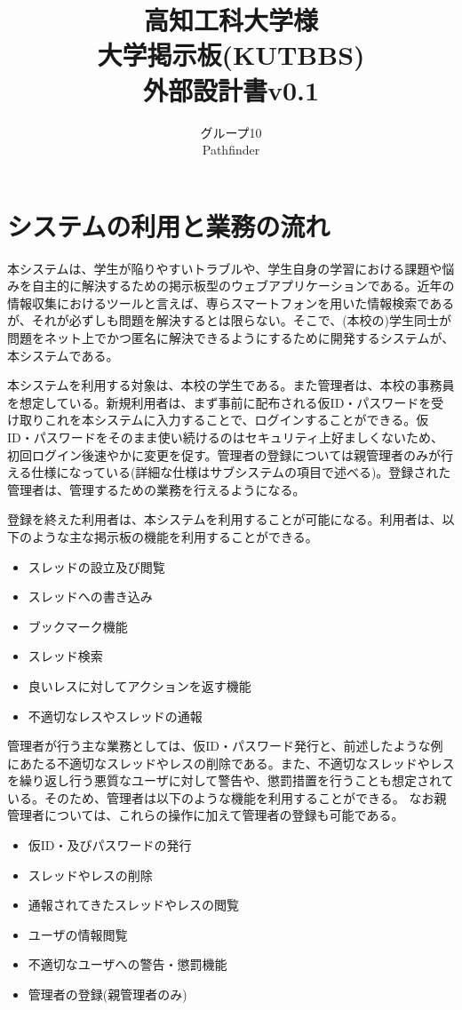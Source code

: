 \documentclass[a4j]{jarticle}
\title{
\vspace{30mm}
{\bf 高知工科大学様}
\\
\vspace{5mm}
大学掲示板(KUTBBS)\\
\vspace{5mm}
{\bf  外部設計書v0.1}
\vspace{90mm}
}
\author{
\vspace{5mm}
グループ10 \\
\vspace{5mm}
Pathfinder \\
\vspace{5mm}
\vspace{10mm}
}
\begin{document}
\maketitle
\tableofcontents
\newpage




\section{システムの利用と業務の流れ}
本システムは、学生が陥りやすいトラブルや、学生自身の学習における課題や悩みを自主的に解決するための掲示板型のウェブアプリケーションである。近年の情報収集におけるツールと言えば、専らスマートフォンを用いた情報検索であるが、それが必ずしも問題を解決するとは限らない。そこで、(本校の)学生同士が問題をネット上でかつ匿名に解決できるようにするために開発するシステムが、本システムである。



本システムを利用する対象は、本校の学生である。また管理者は、本校の事務員を想定している。新規利用者は、まず事前に配布される仮ID・パスワードを受け取りこれを本システムに入力することで、ログインすることができる。仮ID・パスワードをそのまま使い続けるのはセキュリティ上好ましくないため、初回ログイン後速やかに変更を促す。管理者の登録については親管理者のみが行える仕様になっている(詳細な仕様はサブシステムの項目で述べる)。登録された管理者は、管理するための業務を行えるようになる。


登録を終えた利用者は、本システムを利用することが可能になる。利用者は、以下のような主な掲示板の機能を利用することができる。
\begin{itemize}
  \item スレッドの設立及び閲覧
  \item スレッドへの書き込み
  \item ブックマーク機能
  \item スレッド検索
  \item 良いレスに対してアクションを返す機能
  \item 不適切なレスやスレッドの通報
\end{itemize}



管理者が行う主な業務としては、仮ID・パスワード発行と、前述したような例にあたる不適切なスレッドやレスの削除である。また、不適切なスレッドやレスを繰り返し行う悪質なユーザに対して警告や、懲罰措置を行うことも想定されている。そのため、管理者は以下のような機能を利用することができる。
なお親管理者については、これらの操作に加えて管理者の登録も可能である。

\begin{itemize}
  \item 仮ID・及びパスワードの発行
  \item スレッドやレスの削除
  \item 通報されてきたスレッドやレスの閲覧
  \item ユーザの情報閲覧
  \item 不適切なユーザへの警告・懲罰機能
  \item 管理者の登録(親管理者のみ)
\end{itemize}
\end{document}
